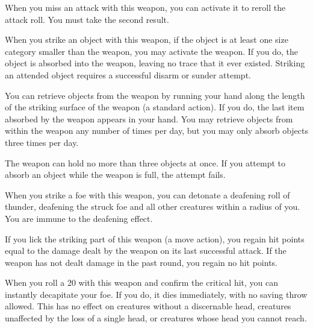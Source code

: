 
 When you miss an attack with this weapon, you can activate it to reroll the attack roll. You must take the second result.


 When you strike an object with this weapon, if the object is at least one size category smaller than the weapon, you may activate the weapon. If you do, the object is absorbed into the weapon, leaving no trace that it ever existed. Striking an attended object requires a successful disarm or sunder attempt.

You can retrieve objects from the weapon by running your hand along the length of the striking surface of the weapon (a standard action). If you do, the last item absorbed by the weapon appears in your hand. You may retrieve objects from within the weapon any number of times per day, but you may only absorb objects three times per day.

The weapon can hold no more than three objects at once. If you attempt to absorb an object while the weapon is full, the attempt fails. 


 When you strike a foe with this weapon, you can detonate a deafening roll of thunder, deafening the struck foe and all other creatures within a \areasmall radius of you. You are immune to the deafening effect.


 If you lick the striking part of this weapon (a move action), you regain hit points equal to the damage dealt by the weapon on its last successful attack. If the weapon has not dealt damage in the past round, you regain no hit points.


 When you roll a 20 with this weapon and confirm the critical hit, you can instantly decapitate your foe. If you do, it dies immediately, with no saving throw allowed. This has no effect on creatures without a discernable head, creatures unaffected by the loss of a single head, or creatures whose head you cannot reach.


